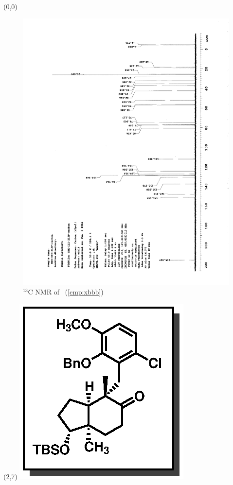 \clearpage
\begin{textblock}{20}(0,0)
\begin{figure}[htb]
\caption{$^{13}$C NMR of  \CMPxbbb\ (\ref{cmp:xbbb})}
\includegraphics[scale=0.75, trim = 0mm 0mm 0mm 5mm,
clip]{chp_singlecarbon/images/nmr/xbbbC}
\vspace{-100pt}
\end{figure}
\end{textblock}
\begin{textblock}{1}(2,7)
\includegraphics[scale=0.8, angle=90]{chp_singlecarbon/images/xbbb}
\end{textblock}
\clearpage

